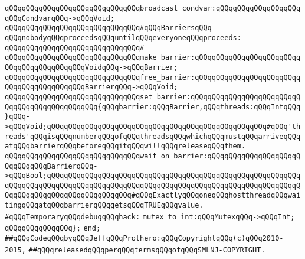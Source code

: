 \verb|qQQqqQQqqQQqqQQqqQQqqQQqqQQqqQQqbroadcast_condvar:qQQqqQQqqQQqqQQqqQQqqQQqCondvarqQQq->qQQqVoid;|\newline
\newline
\verb|qQQqqQQqqQQqqQQqqQQqqQQqqQQqqQQq#qQQqBarriersqQQq--qQQqnobodyqQQqproceedsqQQquntilqQQqeveryoneqQQqproceeds:|\newline
\verb|qQQqqQQqqQQqqQQqqQQqqQQqqQQqqQQq#|\newline
\verb|qQQqqQQqqQQqqQQqqQQqqQQqqQQqqQQqmake_barrier:qQQqqQQqqQQqqQQqqQQqqQQqqQQqqQQqqQQqqQQqqQQqVoidqQQq->qQQqBarrier;|\newline
\verb|qQQqqQQqqQQqqQQqqQQqqQQqqQQqqQQqfree_barrier:qQQqqQQqqQQqqQQqqQQqqQQqqQQqqQQqqQQqqQQqqQQqBarrierqQQq->qQQqVoid;|\newline
\verb|qQQqqQQqqQQqqQQqqQQqqQQqqQQqqQQqset_barrier:qQQqqQQqqQQqqQQqqQQqqQQqqQQqqQQqqQQqqQQqqQQqqQQq{qQQqbarrier:qQQqBarrier,qQQqthreads:qQQqIntqQQq}qQQq->qQQqVoid;qQQqqQQqqQQqqQQqqQQqqQQqqQQqqQQqqQQqqQQqqQQqqQQqqQQq#qQQq'threads'qQQqisqQQqnumberqQQqofqQQqthreadsqQQqwhichqQQqmustqQQqarriveqQQqatqQQqbarrierqQQqbeforeqQQqitqQQqwillqQQqreleaseqQQqthem.|\newline
\verb|qQQqqQQqqQQqqQQqqQQqqQQqqQQqqQQqwait_on_barrier:qQQqqQQqqQQqqQQqqQQqqQQqqQQqqQQqBarrierqQQq->qQQqBool;qQQqqQQqqQQqqQQqqQQqqQQqqQQqqQQqqQQqqQQqqQQqqQQqqQQqqQQqqQQqqQQqqQQqqQQqqQQqqQQqqQQqqQQqqQQqqQQqqQQqqQQqqQQqqQQqqQQqqQQqqQQqqQQqqQQqqQQqqQQqqQQqqQQqqQQqqQQqqQQq#qQQqExactlyqQQqoneqQQqhostthreadqQQqwaitingqQQqatqQQqbarrierqQQqgetsqQQqTRUEqQQqvalue.|\newline
\newline
\newline
\newline
\newline
\newline
\newline
\verb|#qQQqTemporaryqQQqdebugqQQqhack:|\newline
\verb|mutex_to_int:qQQqMutexqQQq->qQQqInt;|\newline
\verb|qQQqqQQqqQQqqQQq};|\newline
\verb|end;|\newline
\newline
\verb|##qQQqCodeqQQqbyqQQqJeffqQQqProthero:qQQqCopyrightqQQq(c)qQQq2010-2015,|\newline
\verb|##qQQqreleasedqQQqperqQQqtermsqQQqofqQQqSMLNJ-COPYRIGHT.|\newline

